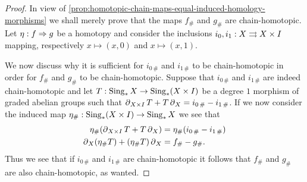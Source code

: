 \begin{proof}
    In view of \cref{prop:homotopic-chain-maps-equal-induced-homology-morphisms} we
    shall merely prove that the maps \(f_{\#}\) and \(g_{\#}\) are
    chain-homotopic. Let \(\eta: f \Rightarrow g\) be a homotopy and consider the
    inclusions \(i_0, i_1: X \rightrightarrows X \times I\) mapping, respectively
    \(x \mapsto (x, 0)\) and \(x \mapsto (x, 1)\).

    We now discuss why it is sufficient for \(i_{0\, \#}\) and \(i_{1\, \#}\) to be
    chain-homotopic in order for \(f_{\#}\) and \(g_{\#}\) to be
    chain-homotopic. Suppose that \(i_{0\, \#}\) and \(i_{1\, \#}\) are indeed
    chain-homotopic and let \(T: \operatorname{Sing}_{*} X \to \operatorname{Sing}_{*}(X \times I)\) be a degree
    \(1\) morphism of graded abelian groups such that
    \(\operatorname{\partial}_{X \times I} T + T \operatorname{\partial}_X = i_{0\, \#} - i_{1\, \#}\). If we now consider
    the induced map \(\eta_{\#}: \operatorname{Sing}_{*}(X \times I) \to \operatorname{Sing}_{*} X\) we see that
    \begin{align*}
        \eta_{\#} (\operatorname{\partial}_{X \times I} T + T \operatorname{\partial}_X)
         & = \eta_{\#} (i_{0\, \#} - i_{1\, \#})
        \\
        \operatorname{\partial}_X (\eta_{\#} T) + (\eta_{\#} T) \operatorname{\partial}_X
         & = f_{\#} - g_{\#}.
    \end{align*}
    Thus we see that if \(i_{0\, \#}\) and \(i_{1\, \#}\) are chain-homotopic it
    follows that \(f_{\#}\) and \(g_{\#}\) are also chain-homotopic, as wanted.


\end{proof}

